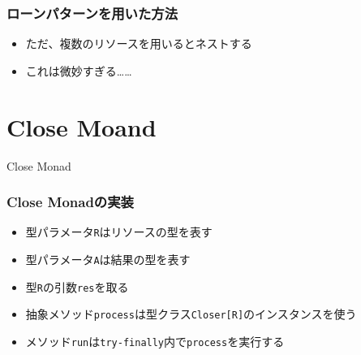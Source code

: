 \begin{frame}
  \frametitle{ローンパターン\cite{loanpattern}を用いた方法}

  \begin{itemize}
    \item ただ、複数のリソースを用いるとネストする
  \end{itemize}


  \begin{itemize}
    \item<3-> これは微妙すぎる……
  \end{itemize}
\end{frame}

\section{Close Moand}

\begin{frame}
  \centering
  {\Huge Close Monad}
\end{frame}

\begin{frame}
  
\end{frame}

\begin{frame}
  \frametitle{Close Monadの実装}

  

  \begin{itemize}
    \item<2-> 型パラメータ\lstinline|R|はリソースの型を表す
    \item<3-> 型パラメータ\lstinline|A|は結果の型を表す
    \item<4-> 型\lstinline|R|の引数\lstinline|res|を取る
    \item<5-> 抽象メソッド\lstinline|process|は型クラス\lstinline|Closer[R]|のインスタンスを使う
    \item<6-> メソッド\lstinline|run|は\lstinline|try-finally|内で\lstinline|process|を実行する
  \end{itemize}
\end{frame}


